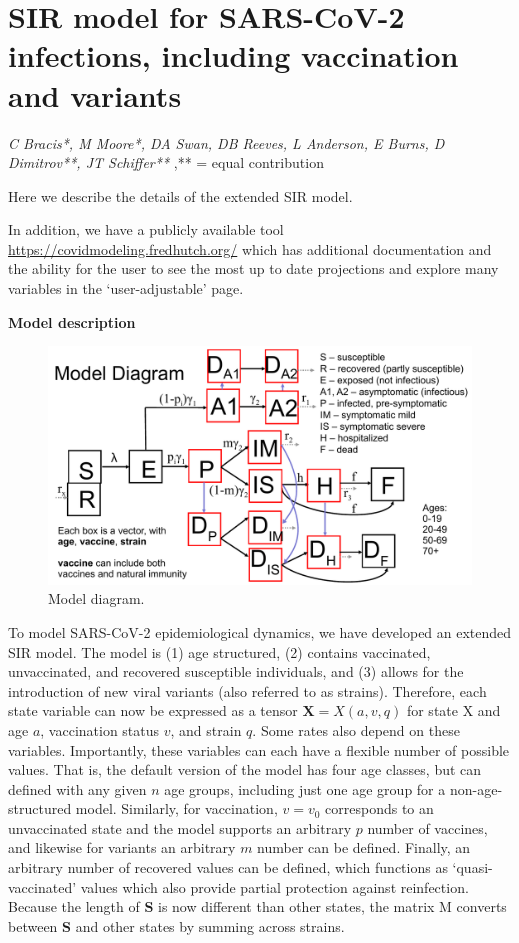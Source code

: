 \documentclass[11pt]{article}
\begin{document}
\section*{SIR model for SARS-CoV-2 infections, including vaccination and variants}

{\it C Bracis*, M Moore*,  DA Swan, DB Reeves, L Anderson, E Burns, D Dimitrov**, JT Schiffer**} \newline
{\tiny *,** = equal contribution}

Here we describe the details of the extended SIR model. 

In addition, we have a publicly available tool {\small\url{https://covidmodeling.fredhutch.org/}} which has additional documentation and the ability for the user to see the most up to date projections and explore many variables in the `user-adjustable' page. 

{\bf Model description}

\begin{figure}[bp]
\centering
\includegraphics[width=\textwidth]{version2_model_diagram}
\caption{Model diagram.}
\label{fig:model}
\end{figure}

To model SARS-CoV-2 epidemiological dynamics, we have developed an extended SIR model. The model is (1) age structured, (2) contains vaccinated, unvaccinated, and recovered susceptible individuals, and (3) allows for the introduction of new viral variants (also referred to as strains). Therefore, each state variable can now be expressed as a tensor $\mathbf{X}=X(a,v,q)$ for state X and age $a$, vaccination status $v$, and strain $q$. Some rates also depend on these variables. Importantly, these variables can each have a flexible number of possible values. That is, the default version of the model has four age classes, but can defined with any given $n$ age groups, including just one age group for a non-age-structured model. Similarly, for vaccination, $v=v_0$ corresponds to an unvaccinated state and the model supports an arbitrary $p$ number of vaccines, and likewise for variants an arbitrary $m$ number can be defined. Finally, an arbitrary number of recovered values can be defined, which functions as `quasi-vaccinated' values which also provide partial protection against reinfection. Because the length of $\mathbf{S}$ is now different than other states, the matrix M converts between $\mathbf{S}$ and other states by summing across strains.
\end{document}
